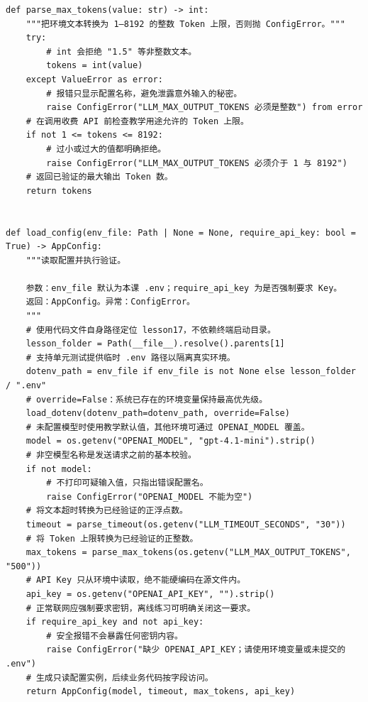 \documentclass[UTF8,11pt,a4paper]{ctexart}
\begin{document}
\begin{Verbatim}[fontsize=\scriptsize,breaklines=true,breakanywhere=true]
def parse_max_tokens(value: str) -> int:
    """把环境文本转换为 1–8192 的整数 Token 上限，否则抛 ConfigError。"""
    try:
        # int 会拒绝 "1.5" 等非整数文本。
        tokens = int(value)
    except ValueError as error:
        # 报错只显示配置名称，避免泄露意外输入的秘密。
        raise ConfigError("LLM_MAX_OUTPUT_TOKENS 必须是整数") from error
    # 在调用收费 API 前检查教学用途允许的 Token 上限。
    if not 1 <= tokens <= 8192:
        # 过小或过大的值都明确拒绝。
        raise ConfigError("LLM_MAX_OUTPUT_TOKENS 必须介于 1 与 8192")
    # 返回已验证的最大输出 Token 数。
    return tokens


def load_config(env_file: Path | None = None, require_api_key: bool = True) -> AppConfig:
    """读取配置并执行验证。

    参数：env_file 默认为本课 .env；require_api_key 为是否强制要求 Key。
    返回：AppConfig。异常：ConfigError。
    """
    # 使用代码文件自身路径定位 lesson17，不依赖终端启动目录。
    lesson_folder = Path(__file__).resolve().parents[1]
    # 支持单元测试提供临时 .env 路径以隔离真实环境。
    dotenv_path = env_file if env_file is not None else lesson_folder / ".env"
    # override=False：系统已存在的环境变量保持最高优先级。
    load_dotenv(dotenv_path=dotenv_path, override=False)
    # 未配置模型时使用教学默认值，其他环境可通过 OPENAI_MODEL 覆盖。
    model = os.getenv("OPENAI_MODEL", "gpt-4.1-mini").strip()
    # 非空模型名称是发送请求之前的基本校验。
    if not model:
        # 不打印可疑输入值，只指出错误配置名。
        raise ConfigError("OPENAI_MODEL 不能为空")
    # 将文本超时转换为已经验证的正浮点数。
    timeout = parse_timeout(os.getenv("LLM_TIMEOUT_SECONDS", "30"))
    # 将 Token 上限转换为已经验证的正整数。
    max_tokens = parse_max_tokens(os.getenv("LLM_MAX_OUTPUT_TOKENS", "500"))
    # API Key 只从环境中读取，绝不能硬编码在源文件内。
    api_key = os.getenv("OPENAI_API_KEY", "").strip()
    # 正常联网应强制要求密钥，离线练习可明确关闭这一要求。
    if require_api_key and not api_key:
        # 安全报错不会暴露任何密钥内容。
        raise ConfigError("缺少 OPENAI_API_KEY；请使用环境变量或未提交的 .env")
    # 生成只读配置实例，后续业务代码按字段访问。
    return AppConfig(model, timeout, max_tokens, api_key)



\end{Verbatim}
\end{document}

